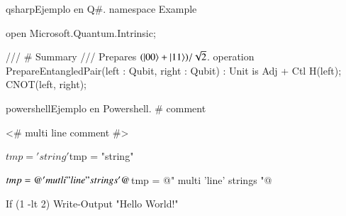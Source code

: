 \begin{sourcecode}{qsharp}{Ejemplo en Q\#.}
namespace Example {
	open Microsoft.Quantum.Intrinsic;

	/// # Summary
	/// Prepares $(\ket{00} + \ket{11}) / \sqrt{2}$.
	operation PrepareEntangledPair(left : Qubit, right : Qubit) : Unit
		is Adj + Ctl {
			H(left);
			CNOT(left, right);
		}
}
\end{sourcecode}

\begin{sourcecode}{powershell}{Ejemplo en Powershell.}
# comment

<#
multi
line
comment
#>

$tmp = 'string'
$tmp = "string"

$tmp = @'
mutli
"line"
strings
'@

$tmp = @"
multi
'line'
strings
"@

If (1 -lt 2) { Write-Output "Hello World!" }
\end{sourcecode}

